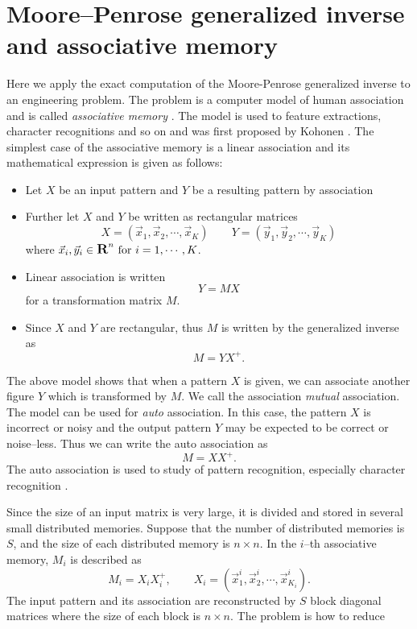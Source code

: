 \section{Moore--Penrose generalized inverse and 
associative memory}

Here we apply the exact computation of the Moore-Penrose 
generalized inverse to an engineering problem.  The 
problem is a computer model of human association and 
is called {\it associative memory } .  The model is 
used to feature extractions, character recognitions 
and so on and was first proposed by Kohonen \cite{Ko77}.  
The simplest case of the associative memory is a 
linear association and its mathematical expression 
is given as follows: 
\begin{itemize}
\item Let $X $ be an input pattern and $Y $ be a 
resulting pattern by association
\item Further let $X$ and $Y$ be written as 
rectangular matrices 
$$ X = (\vec{x}_1,\vec{x}_2,\cdots,\vec{x}_K) \qquad 
Y = (\vec{y}_1,\vec{y}_2,\cdots,\vec{y}_K) $$
where 
$\vec{x}_i ,\vec{y}_i \in \mbox{\R}^n \ \mbox{for } 
i=1, \cdots, K$.
\item Linear association is written 
$$ Y = M X $$
for a transformation matrix $M$.
\item Since $X$ and $Y$ are rectangular, thus $M$ 
is written by the generalized inverse as 
$$ M = Y X^+ . $$
\end{itemize}
The above model shows that when a pattern $X $ is 
given, we can associate another figure $Y$ which is 
transformed by $M $.  We call the association 
{\it mutual } association.  The model can be used 
for {\it auto } association.  In this case, the 
pattern $X $ is incorrect or noisy and the output 
pattern $Y $ may be expected to be correct or 
noise--less.  
Thus we can write the auto association as 
$$ M = X X^+ . $$
The auto association is used to study of pattern 
recognition, especially character recognition 
\cite{Mu93}.  \par
Since the size of an input matrix is very large, it is 
divided and stored in several small distributed 
memories.  Suppose that the number of distributed 
memories is $S$, and the size of each distributed 
memory is $n \times n $.
In the $i$--th associative memory, $M_i $ is described 
as 
$$ M_i = X_i X_i^+ , \qquad X_i = 
(\vec{x}_1^i,\vec{x}_2^i,\cdots,\vec{x}_{K_i}^i ). $$
The input pattern and its association are reconstructed 
by $S $ block diagonal matrices where the size of each 
block is $n \times n$.  The problem is how to reduce 
